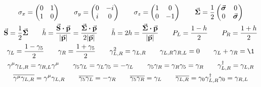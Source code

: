 \begin{gather*}
        \sigma_x = \begin{pmatrix}
                0 &1\\
                1 &0
        \end{pmatrix}
        \qquad
        \sigma_y = \begin{pmatrix}
                0 &-i\\
                i &0
        \end{pmatrix}
        \qquad
        \sigma_z = \begin{pmatrix}
                1 &0\\
                0 &-1
        \end{pmatrix}
        \qquad
        \va*{\Sigma} = \frac{1}{2}\begin{pmatrix}
                \va*{\sigma} &0\\
                0 &\va*{\sigma}\\
        \end{pmatrix}
        \\
        \va{S} = \frac{1}{2}\va*{\Sigma}
        \qquad
        \tilde{h}
        = \frac{\va{S}\vdot\va{p}}{\abs{\va{p}}}
        = \frac{\va*{\Sigma}\vdot\va{p}}{2\abs{\va{p}}}
        \qquad
        \tilde{h}
        = 2h
        = \frac{\va*{\Sigma}\vdot\va{p}}{\abs{\va{p}}}
        \qquad
        P_L = \frac{1 - h}{2}
        \qquad
        P_R = \frac{1 + h}{2}
        \\
        \gamma_L = \frac{1 - \gamma_5}{2}
        \qquad
        \gamma_R = \frac{1 + \gamma_5}{2}
        \qquad
        \gamma_{L,R}^2 = \gamma_{L,R}
        \qquad
        \gamma_{L,R}\gamma_{R,L} = 0
        \qquad
        \gamma_L + \gamma_R = \1
        \\
        \gamma^\mu\gamma_{L,R} = \gamma_{R,L}\gamma^\mu
        \qquad
        \gamma_5\gamma_{L} = \gamma_{L}\gamma_5 = -\gamma_{L}
        \qquad
        \gamma_5\gamma_{R} = \gamma_{R}\gamma_5 = \gamma_{R}
        \qquad
        \gamma_{L,R}^\dagger = \gamma_{L,R}
        \\
        \overline{\gamma^\mu\gamma_{L,R}} = \gamma^\mu\gamma_{L,R}
        \qquad
        \overline{\gamma_5\gamma_{L}} = -\gamma_{R}
        \qquad
        \overline{\gamma_5\gamma_{R}} = \gamma_{L}
        \qquad
        \overline{\gamma_{L,R}}
        = \gamma_0\gamma_{L,R}^\dagger\gamma_0
        = \gamma_{R,L}
\end{gather*}

